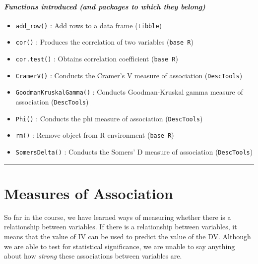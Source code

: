 \documentclass[
]{book}
\providecommand{\tightlist}{%
  \setlength{\itemsep}{0pt}\setlength{\parskip}{0pt}}
\begin{document}
\hypertarget{functions-introduced-and-packages-to-which-they-belong-7}{%
\paragraph*{\texorpdfstring{\emph{Functions introduced (and packages to which they belong)}}{Functions introduced (and packages to which they belong)}}\label{functions-introduced-and-packages-to-which-they-belong-7}}

\begin{itemize}
\tightlist
\item
  \texttt{add\_row()} : Add rows to a data frame (\texttt{tibble})
\item
  \texttt{cor()} : Produces the correlation of two variables (\texttt{base\ R})
\item
  \texttt{cor.test()} : Obtains correlation coefficient (\texttt{base\ R})
\item
  \texttt{CramerV()} : Conducts the Cramer's V measure of association (\texttt{DescTools})
\item
  \texttt{GoodmanKruskalGamma()} : Conducts Goodman-Kruskal gamma measure of association (\texttt{DescTools})
\item
  \texttt{Phi()} : Conducts the phi measure of association (\texttt{DescTools})
\item
  \texttt{rm()} : Remove object from R environment (\texttt{base\ R})
\item
  \texttt{SomersDelta()} : Conducts the Somers' D measure of association (\texttt{DescTools})
\end{itemize}

\begin{center}\rule{0.5\linewidth}{0.5pt}\end{center}

\hypertarget{measures-of-association}{%
\section{Measures of Association}\label{measures-of-association}}

So far in the course, we have learned ways of measuring whether there is a relationship between variables. If there is a relationship between variables, it means that the value of IV can be used to predict the value of the DV. Although we are able to test for statistical significance, we are unable to say anything about how \emph{strong} these associations between variables are.
\end{document}
